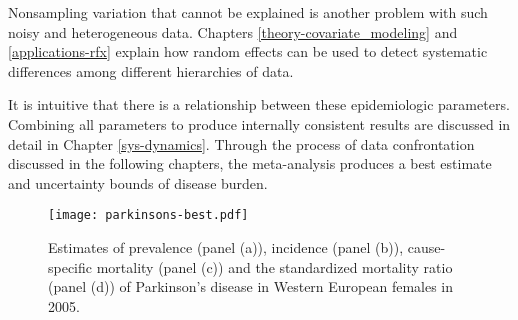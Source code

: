 Nonsampling variation that cannot be explained is another problem with such noisy and heterogeneous data.  Chapters \ref{theory-covariate_modeling} and \ref{applications-rfx} explain how random effects can be used to detect systematic differences among different hierarchies of data.

It is intuitive that there is a relationship between these epidemiologic parameters.  Combining all parameters to produce internally consistent results are discussed in detail in Chapter \ref{sys-dynamics}.  Through the process of data confrontation discussed in the following chapters, the meta-analysis produces a best estimate and uncertainty bounds of disease burden.

    \begin{figure}[h]
        \begin{center}
            \texttt{[image: parkinsons-best.pdf]}
            \caption{Estimates of prevalence (panel (a)), incidence (panel (b)), cause-specific mortality (panel (c)) and the standardized mortality ratio (panel (d)) of Parkinson's disease in Western European females in 2005.}
            \label{fig:intro-parkinsons fit}
        \end{center}
    \end{figure} 
